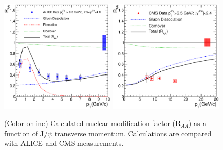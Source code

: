 \documentclass[aps,prc,preprint,superscriptaddress,showpacs,showkeys]{revtex4-1}
\begin{document}
\begin{figure}
\includegraphics[width=0.49\textwidth]{ALICE_RAAPt.eps}
\includegraphics[width=0.49\textwidth]{CMS_RAAPt.eps}
\caption{(Color online) Calculated nuclear modification factor (R$_{AA}$) as a function of J/$\psi$ transverse momentum. Calculations are
compared with ALICE and CMS measurements.}
\label{fig:JPsiRaaVsPt}
\end{figure}
\end{document}
